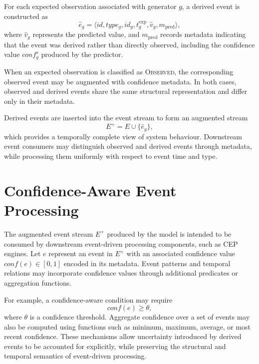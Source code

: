 For each expected observation associated with generator $g$, a derived event is constructed as
\begin{equation}
\hat{e}_g =
\langle id, type_g, id_g, t^{\mathrm{exp}}_g, \hat{v}_g, m_{\mathrm{pred}} \rangle ,
\end{equation}
\noindent
where $\hat{v}_g$ represents the predicted value, and $m_{\mathrm{pred}}$ records metadata indicating that the event was derived rather than directly observed, including the confidence value $conf_g^{s}$ produced by the predictor.

When an expected observation is classified as \textsc{Observed}, the corresponding observed event may be augmented with confidence metadata. In both cases, observed and derived events share the same structural representation and differ only in their metadata.

Derived events are inserted into the event stream to form an augmented stream
\begin{equation}
E^{+} = E \cup \{ \hat{e}_g \},
\end{equation} 
which provides a temporally complete view of system behaviour. Downstream event consumers may distinguish observed and derived events through metadata, while processing them uniformly with respect to event time and type.



\section{Confidence-Aware Event Processing}
\label{sec:confidence-aware-semantics}
The augmented event stream $E^{+}$ produced by the model is intended to be consumed by downstream event-driven processing components, such as CEP engines. Let $e$ represent an event in $E^{+}$ with an associated confidence value $conf(e) \in [0,1]$ encoded in its metadata. Event patterns and temporal relations may incorporate confidence values through additional predicates or aggregation functions.

For example, a confidence-aware condition may require
\begin{equation}
conf(e) \ge \theta ,
\end{equation}
\noindent
where $\theta$ is a confidence threshold. Aggregate confidence over a set of events may also be computed using functions such as minimum, maximum, average, or most recent confidence. These mechanisms allow uncertainty introduced by derived events to be accounted for explicitly, while preserving the structural and temporal semantics of event-driven processing.



